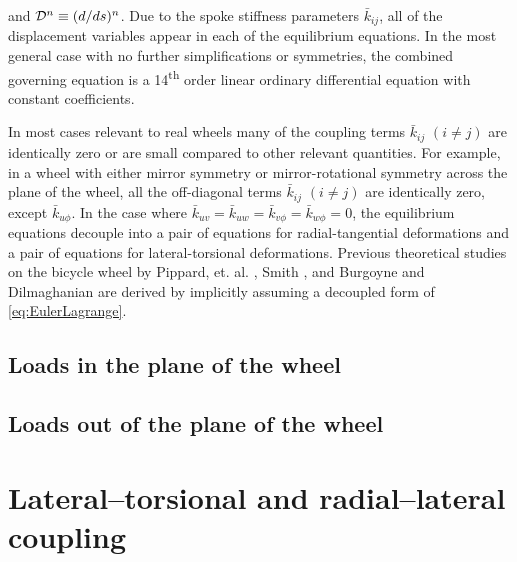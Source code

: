 \documentclass[\rootdir/thesis.tex]{subfiles}
\begin{document}
and $\mathcal{D}^n \equiv (d/ds)^n$. Due to the spoke stiffness parameters $\bar{k}_{ij}$, all of the displacement variables appear in each of the equilibrium equations. In the most general case with no further simplifications or symmetries, the combined governing equation is a 14\textsuperscript{th} order linear ordinary differential equation with constant coefficients.

In most cases relevant to real wheels many of the coupling terms $\bar{k}_{ij}$ $(i \neq j)$ are identically zero or are small compared to other relevant quantities. For example, in a wheel with either mirror symmetry or mirror-rotational symmetry across the plane of the wheel, all the off-diagonal terms $\bar{k}_{ij}$ $(i \neq j)$ are identically zero, except $\bar{k}_{u\phi}$. In the case where $\bar{k}_{uv}=\bar{k}_{uw}=\bar{k}_{v\phi}=\bar{k}_{w\phi}=0$, the equilibrium equations decouple into a pair of equations for radial-tangential deformations and a pair of equations for lateral-torsional deformations. Previous theoretical studies on the bicycle wheel by Pippard, et. al. \cite{Pippard1931,Pippard1932a,Pippard1932b}, Smith \cite{Smith1901}, and Burgoyne and Dilmaghanian \cite{Burgoyne1993} are derived by implicitly assuming a decoupled form of \eqref{eq:EulerLagrange}.

\subsection{Loads in the plane of the wheel}
\label{sec:RadTan}


\subsection{Loads out of the plane of the wheel}
\label{sec:Lateral}


\section{Lateral--torsional and radial--lateral coupling}
\label{sec:coupling}

\inprogress
\end{document}
